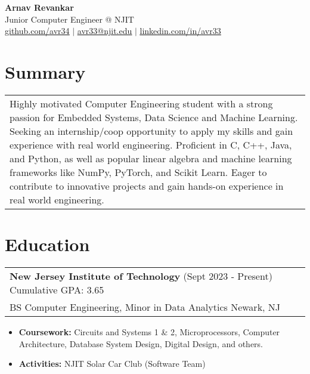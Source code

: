 \documentclass{article}
\newcommand{\underlinedLink}[2]{
    {\underline{\large \href{#1}{#2}}}
}
\begin{document}
\begin{spacing}{1.4}
    \begin{center}
        {\bf\Huge Arnav Revankar} \\
        {\large Junior Computer Engineer @ NJIT} \\
        \underlinedLink{https://github.com/BumpyTurtle127}{github.com/avr34} $|$ \underlinedLink{mailto:avr33@njit.edu}{avr33@njit.edu} $|$ \underlinedLink{https://linkedin.com/in/avr33}{linkedin.com/in/avr33}
    \end{center}
\end{spacing}
\vspace{-9pt}

\section{Summary}
    \begin{center}
        \begin{tabular}{p{}}
            Highly motivated Computer Engineering student with a strong passion for Embedded Systems, Data Science and Machine Learning. Seeking an internship/coop opportunity to apply my skills and gain experience with real world engineering. Proficient in C, C++, Java, and Python, as well as popular linear algebra and machine learning frameworks like NumPy, PyTorch, and Scikit Learn. Eager to contribute to innovative projects and gain hands-on experience in real world engineering. \\
        \end{tabular}
    \end{center}

\section{Education}
    \vspace{-5pt}\begin{center}
        \begin{tabular}{p{}}
            {\large \bf New Jersey Institute of Technology} (Sept 2023 - Present) \hfill Cumulative GPA: 3.65 \\
            BS Computer Engineering, Minor in Data Analytics \hfill Newark, NJ
        \end{tabular}
    \end{center}
    \vspace{-10pt}\begin{itemize}
        \item {\bf Coursework:} Circuits and Systems 1 \& 2, Microprocessors, Computer Architecture, Database System Design, Digital Design, and others.
        \item {\bf Activities:} NJIT Solar Car Club (Software Team)
    \end{itemize}
\end{document}
